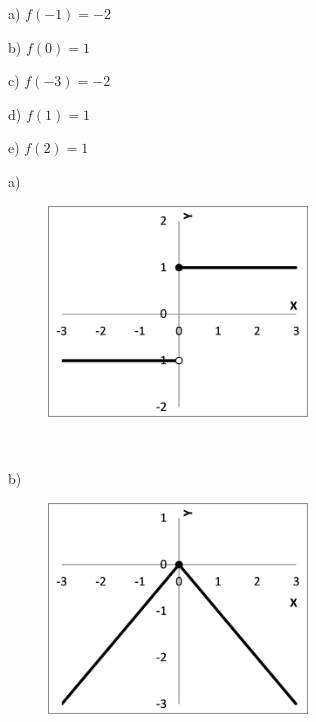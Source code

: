 \begin{respostas}{5}
	\ansitem{} 
	\begin{multicols}{2}
		a) \( f \left( -1 \right) =-2 \)
		
		b) \( f \left( 0 \right) =1 \)

		c) \( f \left( -3 \right) =-2 \)
		
		d)  \( f \left( 1 \right) =1 \)
		
		e) \( f \left( 2 \right) =1 \)
				
	\end{multicols}

	\ansitem{} a)

	\begin{figure}[H]
		\begin{Center}
			\includegraphics[width=2.71in,height=2.2in]{capitulos/outras_funcoes/media/image70.png}
		\end{Center}
	\end{figure}

~~

	b)

	\begin{figure}[H]
		\begin{Center}
			\includegraphics[width=2.71in,height=2.2in]{capitulos/outras_funcoes/media/image71.png}
		\end{Center}
	\end{figure}

~~


\end{respostas}
